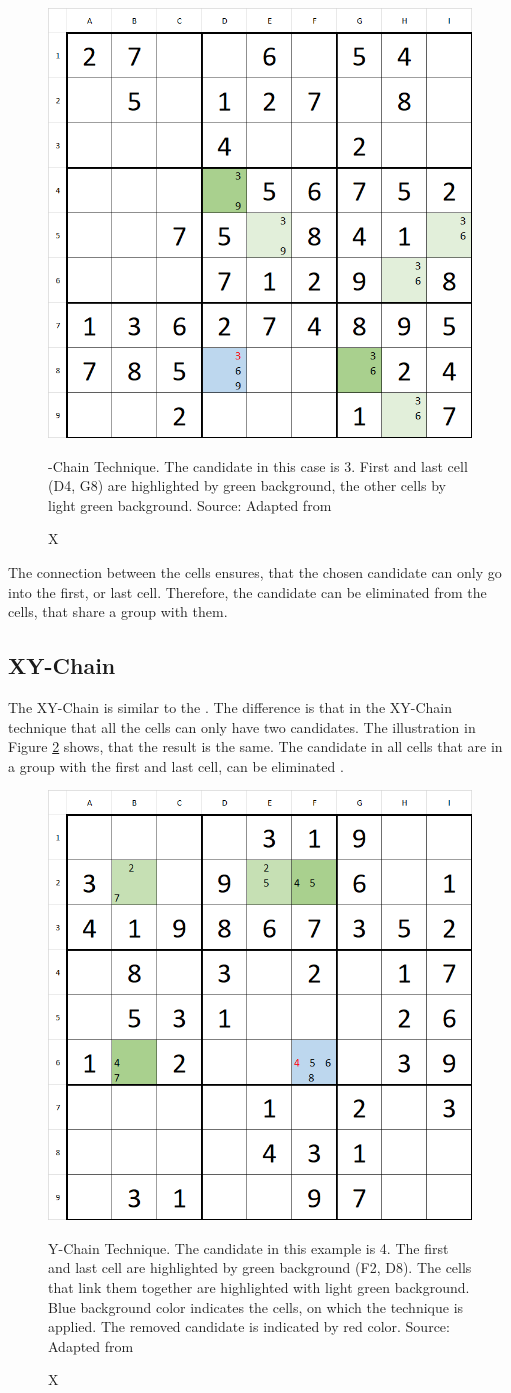 \documentclass[twoside]{ausarbeitung}
\begin{document}
\begin{figure}[H]
  \centering
  \includegraphics[width=.55\linewidth]{images/xchain}
  \caption[X-Chain] X-Chain Technique. The candidate in this case is 3. First and last cell (D4, G8) are highlighted by green background, the other cells by light green background. Source: Adapted from \cite{XChainSu93:online}
  \label{fig:xchain}
\end{figure}%

The connection between the cells ensures, that the chosen candidate can only go into the first, or last cell. Therefore, the candidate can be eliminated from the cells, that share a group with them.

\subsection{XY-Chain}
The XY-Chain is similar to the . The difference is that in the XY-Chain technique that all the cells can only have two candidates. The illustration in Figure \ref{fig:xychain} shows, that the result is the same. The candidate in all cells that are in a group with the first and last cell, can be eliminated \cite{SudokuXY13:online}.


\begin{figure}[H]
  \centering
  \includegraphics[width=.55\linewidth]{images/xychain}
  \caption[XY-Chain] XY-Chain Technique. The candidate in this example is 4. The first and last cell are highlighted by green background (F2, D8). The cells that link them together are highlighted with light green background. Blue background color indicates the cells, on which the technique is applied. The removed candidate is indicated by red color.  Source: Adapted from \cite{SudokuXY13:online}
  \label{fig:xychain}
\end{figure}%
\end{document}
